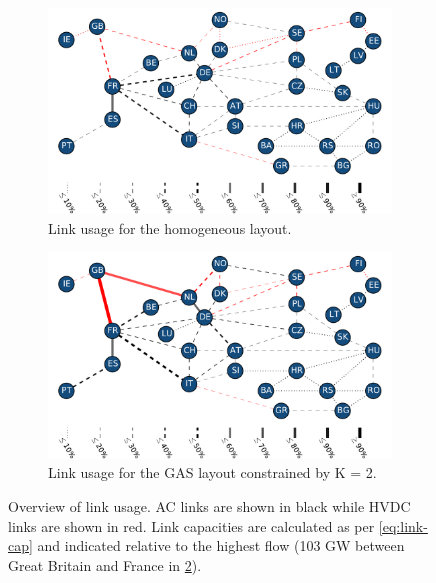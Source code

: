 \documentclass[a4paper, 5p, sort&compress]{elsarticle}%
\begin{document}
\begin{figure}[t!]
  \centering
  \begin{subfigure}{1\columnwidth}
    \includegraphics[width = \columnwidth, center]{links-homogeneous}
    \caption{Link usage for the homogeneous layout.}
    \label{fig:links-homo}
  \end{subfigure}
  \begin{subfigure}{1\columnwidth}
    \includegraphics[width = \columnwidth, center]{links-gas-k=2}
    \caption{Link usage for the GAS layout constrained by K = 2.}
    \label{fig:links-k2}
  \end{subfigure}
  \caption{Overview of link usage. AC links are shown in black while
    HVDC links are shown in red. Link capacities are calculated as per
    \cref{eq:link-cap} and indicated relative to the highest flow (103 GW
    between Great Britain and France in \cref{fig:links-k2}).}
  \label{fig:links}
\end{figure}
\end{document}
